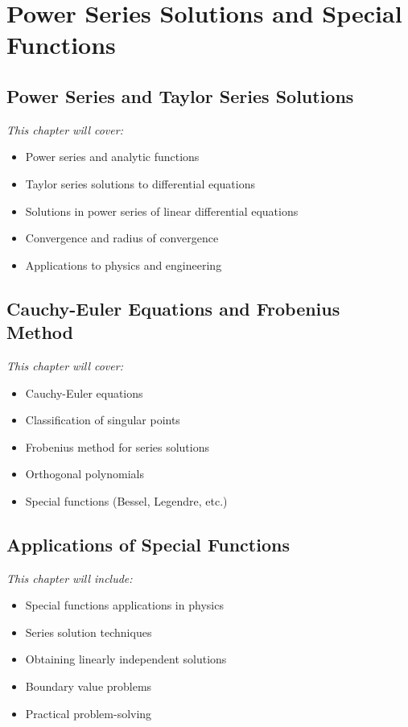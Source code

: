\documentclass[12pt, letterpaper]{book}
\theoremstyle{problemstyle}
\theoremstyle{solutionstyle}
\begin{document}
\part{Power Series Solutions and Special Functions}
\label{part:power_series_special_functions}

\chapter{Power Series and Taylor Series Solutions}
\label{chap:session_8}

\textit{This chapter will cover:}
\begin{itemize}
    \item Power series and analytic functions
    \item Taylor series solutions to differential equations
    \item Solutions in power series of linear differential equations
    \item Convergence and radius of convergence
    \item Applications to physics and engineering
\end{itemize}

\chapter{Cauchy-Euler Equations and Frobenius Method}
\label{chap:session_9}

\textit{This chapter will cover:}
\begin{itemize}
    \item Cauchy-Euler equations
    \item Classification of singular points
    \item Frobenius method for series solutions
    \item Orthogonal polynomials
    \item Special functions (Bessel, Legendre, etc.)
\end{itemize}

\chapter{Applications of Special Functions}
\label{chap:session_10}

\textit{This chapter will include:}
\begin{itemize}
    \item Special functions applications in physics
    \item Series solution techniques
    \item Obtaining linearly independent solutions
    \item Boundary value problems
    \item Practical problem-solving
\end{itemize}
\end{document}
